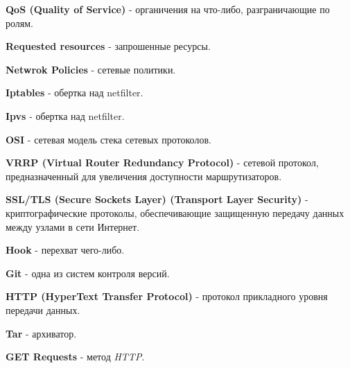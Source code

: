 \textbf{QoS (Quality of Service)} - органичения на что-либо, разграничающие по ролям.

\textbf{Requested resources} - запрошенные ресурсы.

\textbf{Netwrok Policies} - сетевые политики.

\textbf{Iptables} - обертка над netfilter.

\textbf{Ipvs} - обертка над netfilter.

\textbf{OSI} - сетевая модель стека сетевых протоколов.

\textbf{VRRP (Virtual Router Redundancy Protocol)} - сетевой протокол, предназначенный для увеличения доступности маршрутизаторов.

\textbf{SSL/TLS (Secure Sockets Layer) (Transport Layer Security)} - криптографические протоколы, обеспечивающие защищенную передачу данных между узлами в сети Интернет.

\textbf{Hook} - перехват чего-либо.

\textbf{Git} - одна из систем контроля версий.

\textbf{HTTP (HyperText Transfer Protocol)} - протокол прикладного уровня передачи данных.

\textbf{Tar} - архиватор.

\textbf{GET Requests} - метод \textit{HTTP}.
